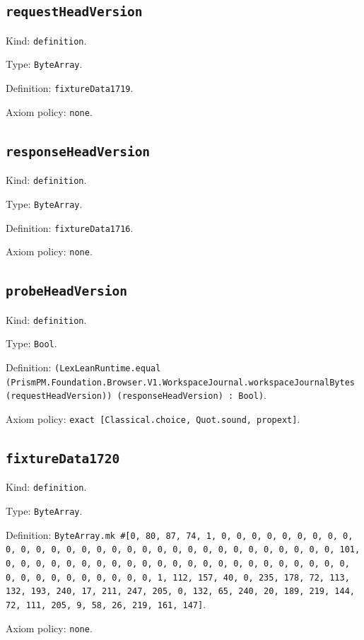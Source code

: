 \documentclass[11pt]{article}
\begin{document}
\subsection*{\texttt{requestHeadVersion}}
\noindent Kind: \texttt{definition}.\par
\noindent Type: \texttt{ByteArray}.\par
\noindent Definition: \texttt{fixtureData1719}.\par
\noindent Axiom policy: \texttt{none}.\par
\subsection*{\texttt{responseHeadVersion}}
\noindent Kind: \texttt{definition}.\par
\noindent Type: \texttt{ByteArray}.\par
\noindent Definition: \texttt{fixtureData1716}.\par
\noindent Axiom policy: \texttt{none}.\par
\subsection*{\texttt{probeHeadVersion}}
\noindent Kind: \texttt{definition}.\par
\noindent Type: \texttt{Bool}.\par
\noindent Definition: \texttt{(LexLeanRuntime.equal (PrismPM.Foundation.Browser.V1.WorkspaceJournal.workspaceJournalBytes (requestHeadVersion)) (responseHeadVersion) : Bool)}.\par
\noindent Axiom policy: \texttt{exact [Classical.choice, Quot.sound, propext]}.\par
\subsection*{\texttt{fixtureData1720}}
\noindent Kind: \texttt{definition}.\par
\noindent Type: \texttt{ByteArray}.\par
\noindent Definition: \texttt{ByteArray.mk \#[0, 80, 87, 74, 1, 0, 0, 0, 0, 0, 0, 0, 0, 0, 0, 0, 0, 0, 0, 0, 0, 0, 0, 0, 0, 0, 0, 0, 0, 0, 0, 0, 0, 0, 0, 0, 101, 0, 0, 0, 0, 0, 0, 0, 0, 0, 0, 0, 0, 0, 0, 0, 0, 0, 0, 0, 0, 0, 0, 0, 0, 0, 0, 0, 0, 0, 0, 0, 0, 0, 1, 112, 157, 40, 0, 235, 178, 72, 113, 132, 193, 240, 17, 211, 247, 205, 0, 132, 65, 240, 20, 189, 219, 144, 72, 111, 205, 9, 58, 26, 219, 161, 147]}.\par
\noindent Axiom policy: \texttt{none}.\par
\end{document}
